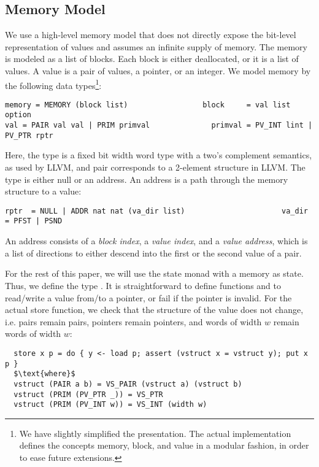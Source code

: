 \documentclass[a4paper,USenglish,cleveref, autoref]{lipics-v2019}
\begin{document}
\subsection{Memory Model}
We use a high-level memory model that does not directly expose the bit-level representation of values and assumes an infinite supply of memory. 
The memory is modeled as a list of blocks. Each block is either deallocated, or it is a list of values.
A value is a pair of values, a pointer, or an integer. We model memory by the following data types\footnote{We have slightly simplified the presentation. 
The actual implementation defines the concepts memory, block, and value in a modular fashion, in order to ease future extensions.
}:
\begin{lstlisting}
memory = MEMORY (block list)                 block     = val list option
val = PAIR val val | PRIM primval              primval = PV_INT lint | PV_PTR rptr
\end{lstlisting}
%
Here, the type  is a fixed bit width word type with a two's complement semantics, as used by LLVM, 
and pair corresponds to a 2-element structure in LLVM. 
The type  is either null or an address. An address is a path through the memory structure to a value:
\begin{lstlisting}
rptr  = NULL | ADDR nat nat (va_dir list)                      va_dir = PFST | PSND
\end{lstlisting}
An address consists of a \emph{block index}, a \emph{value index}, and a \emph{value address}, which is a list of directions 
to either descend into the first or the second value of a pair.

For the rest of this paper, we will use the state monad with a memory as state. Thus, we define the type .
It is straightforward to define functions  and  to read/write a value from/to a pointer, 
or fail if the pointer is invalid.
For the actual store function, we check that the structure of the value does not change, i.e. pairs remain pairs, pointers remain pointers, and words of width $w$ remain words of width $w$:
\begin{lstlisting}
  store x p = do { y <- load p; assert (vstruct x = vstruct y); put x p }
  $\text{where}$
  vstruct (PAIR a b) = VS_PAIR (vstruct a) (vstruct b)
  vstruct (PRIM (PV_PTR _)) = VS_PTR
  vstruct (PRIM (PV_INT w)) = VS_INT (width w) 
\end{lstlisting}
\end{document}
